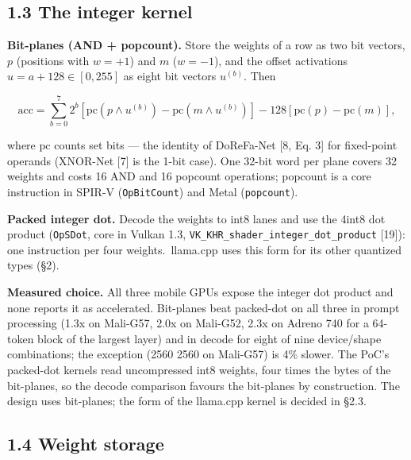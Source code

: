 \documentclass[
  10pt,
]{article}
\newcounter{none} %
\begin{document}
\subsection{1.3 The integer kernel}\label{the-integer-kernel}

\textbf{Bit-planes (AND + popcount).} Store the weights of a row as two
bit vectors, \(p\) (positions with \(w = +1\)) and \(m\) (\(w = -1\)),
and the offset activations \(u = a + 128 \in[0, 255]\) as eight bit
vectors \(u^{(b)}\). Then

\[
\mathrm{acc} = \sum_{b=0}^{7} 2^{b}\left[\mathrm{pc}(p \wedge u^{(b)}) -
\mathrm{pc}(m \wedge u^{(b)})\right] - 128\left[\mathrm{pc}(p) - \mathrm{pc}(m)\right],
\]

where \(\mathrm{pc}\) counts set bits --- the identity of DoReFa-Net
[8, Eq. 3] for fixed-point operands (XNOR-Net [7] is the 1-bit
case). One 32-bit word per plane covers 32 weights and costs 16 AND and
16 popcount operations; popcount is a core instruction in SPIR-V
(\texttt{OpBitCount}) and Metal (\texttt{popcount}).

\textbf{Packed integer dot.} Decode the weights to int8 lanes and use
the 4\texttimes{}int8 dot product (\texttt{OpSDot}, core in Vulkan 1.3,
\texttt{VK\_KHR\_shader\_integer\_dot\_product} [19]): one
instruction per four weights.\ llama.cpp uses this form for its other
quantized types (\S{}2).

\textbf{Measured choice.} All three mobile GPUs expose the integer dot
product and none reports it as accelerated. Bit-planes beat packed-dot
on all three in prompt processing (1.3x on Mali-G57, 2.0x on Mali-G52,
2.3x on Adreno 740 for a 64-token block of the largest layer) and in
decode for eight of nine device/shape combinations; the exception (2560
\texttimes{} 2560 on Mali-G57) is 4\% slower. The PoC's packed-dot kernels read
uncompressed int8 weights, four times the bytes of the bit-planes, so
the decode comparison favours the bit-planes by construction. The design
uses bit-planes; the form of the llama.cpp kernel is decided in \S{}2.3.

\subsection{1.4 Weight storage}\label{weight-storage}
\end{document}
